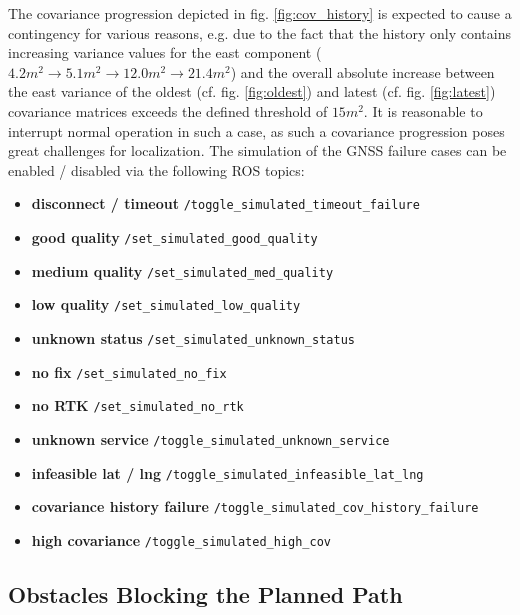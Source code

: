 \documentclass[english, master, utf8]{base/thesis_KBS}
\newcommand{\code}[1]{\colorbox{light-gray}{\texttt{#1}}}
\begin{document}
\noindent
The covariance progression depicted in fig. \ref{fig:cov_history} is expected to cause a contingency for various reasons, e.g. due to the fact that the history only
contains increasing variance values for the east component ($4.2 m^2 \rightarrow 5.1 m^2 \rightarrow 12.0 m^2 \rightarrow 21.4 m^2$) and the overall absolute increase between
the east variance of the oldest (cf. fig. \ref{fig:oldest}) and latest (cf. fig. \ref{fig:latest}) covariance matrices exceeds the defined threshold of $15 m^2$.
It is reasonable to interrupt normal operation in such a case, as such a covariance progression poses great challenges for localization.
The simulation of the GNSS failure cases can be enabled / disabled via the following ROS topics:
\begin{itemize}
    \item \textbf{disconnect / timeout} \textrightarrow \code{/toggle\_simulated\_timeout\_failure}
    \item \textbf{good quality} \textrightarrow \code{/set\_simulated\_good\_quality}
    \item \textbf{medium quality} \textrightarrow \code{/set\_simulated\_med\_quality}
    \item \textbf{low quality} \textrightarrow \code{/set\_simulated\_low\_quality}
    \item \textbf{unknown status} \textrightarrow \code{/set\_simulated\_unknown\_status}
    \item \textbf{no fix} \textrightarrow \code{/set\_simulated\_no\_fix}
    \item \textbf{no RTK} \textrightarrow \code{/set\_simulated\_no\_rtk}
    \item \textbf{unknown service} \textrightarrow \code{/toggle\_simulated\_unknown\_service}
    \item \textbf{infeasible lat / lng} \textrightarrow \code{/toggle\_simulated\_infeasible\_lat\_lng}
    \item \textbf{covariance history failure} \textrightarrow \code{/toggle\_simulated\_cov\_history\_failure}
    \item \textbf{high covariance} \textrightarrow \code{/toggle\_simulated\_high\_cov}
\end{itemize}

\subsection{Obstacles Blocking the Planned Path}
\label{sec:sim_and_mon_obstacles}
\end{document}
